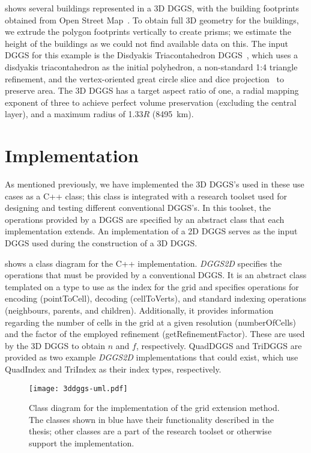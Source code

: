  shows several buildings represented in a 3D DGGS, with the building footprints obtained from Open Street Map~\cite{osm}.
To obtain full 3D geometry for the buildings, we extrude the polygon footprints vertically to create prisms; we estimate the height of the buildings as we could not find available data on this.
The input DGGS for this example is the Disdyakis Triacontahedron DGGS~\cite{hall2020disdyakis}, which uses a disdyakis triacontahedron as the initial polyhedron, a non-standard 1:4 triangle refinement, and the vertex-oriented great circle slice and dice projection~\cite{van2006slice} to preserve area.
The 3D DGGS has a target aspect ratio of one, a radial mapping exponent of three to achieve perfect volume preservation (excluding the central layer), and a maximum radius of 1.33$R$ (8495~km).


\section{Implementation} \label{chap:8:impl}
As mentioned previously, we have implemented the 3D DGGS's used in these use cases as a C++ class; this class is integrated with a research toolset used for designing and testing different conventional DGGS's.
In this toolset, the operations provided by a DGGS are specified by an abstract class that each implementation extends.
An implementation of a 2D DGGS serves as the input DGGS used during the construction of a 3D DGGS.


 shows a class diagram for the C++ implementation.
\textit{DGGS2D} specifies the operations that must be provided by a conventional DGGS.
It is an abstract class templated on a type to use as the index for the grid and specifies operations for encoding (pointToCell), decoding (cellToVerts), and standard indexing operations (neighbours, parents, and children).
Additionally, it provides information regarding the number of cells in the grid at a given resolution (numberOfCells) and the factor of the employed refinement (getRefinementFactor).
These are used by the 3D DGGS to obtain $n$ and $f$, respectively. QuadDGGS and TriDGGS are provided as two example \textit{DGGS2D} implementations that could exist, which use QuadIndex and TriIndex as their index types, respectively.


\begin{figure}[ht!]
	\centering
	\texttt{[image: 3ddggs-uml.pdf]}
	\caption[Class diagram of the grid extension implementation]{
		Class diagram for the implementation of the grid extension method. The classes shown in blue have their functionality described in the thesis; other classes are a part of the research toolset or otherwise support the implementation.
	}
	\label{fig:uml}
\end{figure}



